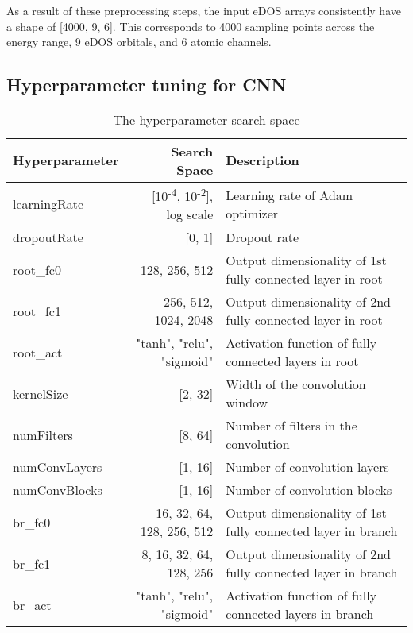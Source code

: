 As a result of these preprocessing steps, the input eDOS arrays consistently have a shape of [4000, 9, 6]. This corresponds to 4000 sampling points across the energy range, 9 eDOS orbitals, and 6 atomic channels.


\subsection{Hyperparameter tuning for CNN}

\begin{table}[h]
  \centering
  \begin{tabular}{lrp{5.5cm}}
    \hline
    \textbf{Hyperparameter} & \textbf{Search Space}                             & \textbf{Description}            \\
    \hline
    learningRate  & [10\textsuperscript{-4}, 10\textsuperscript{-2}], log scale & Learning rate of Adam optimizer \\
    dropoutRate   & [0, 1]                    & Dropout rate                                                      \\
    root\_fc0     & 128, 256, 512             & Output dimensionality of 1st fully connected layer in root        \\
    root\_fc1     & 256, 512, 1024, 2048      & Output dimensionality of 2nd fully connected layer in root        \\
    root\_act     & "tanh", "relu", "sigmoid" & Activation function of fully connected layers in root             \\
    kernelSize    & [2, 32]                   & Width of the convolution window                                   \\
    numFilters    & [8, 64]                   & Number of filters in the convolution                              \\
    numConvLayers & [1, 16]                   & Number of convolution layers                                      \\
    numConvBlocks & [1, 16]                   & Number of convolution blocks                                      \\
    br\_fc0       & 16, 32, 64, 128, 256, 512 & Output dimensionality of 1st fully connected layer in branch      \\
    br\_fc1       & 8, 16, 32, 64, 128, 256   & Output dimensionality of 2nd fully connected layer in branch      \\
    br\_act       & "tanh", "relu", "sigmoid" & Activation function of fully connected layers in branch           \\
    \hline
  \end{tabular}
  \caption{The hyperparameter search space}
  \label{si_table16}
\end{table}



